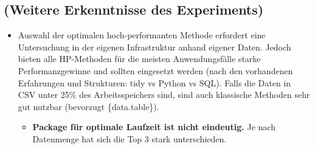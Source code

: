 \documentclass[
  german,
  10pt,
  twoside]{article}
\providecommand{\tightlist}{%
  \setlength{\itemsep}{0pt}\setlength{\parskip}{0pt}}
\begin{document}
\subsection{(Weitere Erkenntnisse des
Experiments)}\label{weitere-erkenntnisse-des-experiments}

\begin{itemize}
\tightlist
\item
  Auswahl der optimalen hoch-performanten Methode erfordert eine
  Untersuchung in der eigenen Infrastruktur anhand eigener Daten. Jedoch
  bieten alle HP-Methoden für die meisten Anwendungsfälle starke
  Performanzgewinne und sollten eingesetzt werden (nach den vorhandenen
  Erfahrungen und Strukturen: tidy vs Python vs SQL). Falls die Daten in
  CSV unter 25\% des Arbeitsspeichers sind, sind auch klassische
  Methoden sehr gut nutzbar (bevorzugt \{data.table\}).

  \begin{itemize}
  \tightlist
  \item
    \textbf{Package für optimale Laufzeit ist nicht eindeutig.} Je nach
    Datenmenge hat sich die Top 3 stark unterschieden.


\end{itemize}
\end{itemize}
\end{document}
